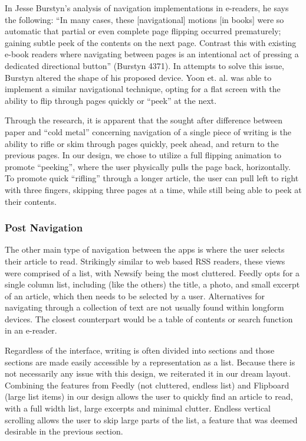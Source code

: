 \documentclass[11pt, oneside]{article}   	%
\begin{document}
In Jesse Burstyn's analysis of navigation implementations in e-readers, he says the following: ``In many cases, these [navigational] motions [in books] were so automatic that partial or even complete page flipping occurred prematurely; gaining subtle peek of the contents on the next page. Contrast this with existing e-book readers where navigating between pages is an intentional act of pressing a dedicated directional button'' (Burstyn 4371). In attempts to solve this issue, Burstyn altered the shape of his proposed device. Yoon et. al. was able to implement a similar navigational technique, opting for a flat screen with the ability to flip through pages quickly or ``peek'' at the next.

Through the research, it is apparent that the sought after difference between paper and ``cold metal'' concerning navigation of a single piece of writing is the ability to rifle or skim through pages quickly, peek ahead, and return to the previous pages. In our design, we chose to utilize a full flipping animation to promote ``peeking'', where the user physically pulls the page back, horizontally. To promote quick ``rifling'' through a longer article, the user can pull left to right with three fingers, skipping three pages at a time, while still being able to peek at their contents.

\subsubsection{Post Navigation}
The other main type of navigation between the apps is where the user selects their article to read. Strikingly similar to web based RSS readers, these views were comprised of a list, with Newsify being the most cluttered. Feedly opts for a single column list, including (like the others) the title, a photo, and small excerpt of an article, which then needs to be selected by a user. Alternatives for navigating through a collection of text are not usually found within longform devices. The closest counterpart would be a table of contents or search function in an e-reader.

Regardless of the interface, writing is often divided into sections and those sections are made easily accessible by a representation as a list. Because there is not necessarily any issue with this design, we reiterated it in our dream layout. Combining the features from Feedly (not cluttered, endless list) and Flipboard (large list items) in our design allows the user to quickly find an article to read, with a full width list, large excerpts and minimal clutter. Endless vertical scrolling allows the user to skip large parts of the list, a feature that was deemed desirable in the previous section.
\end{document}
